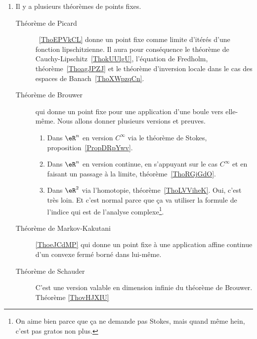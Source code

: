         \label{THEMEooWAYJooUSnmMh}
\begin{enumerate}
	\item
	      Il y a plusieurs théorèmes de points fixes.
	      \begin{description}
		      \item[Théorème de Picard]~\ref{ThoEPVkCL} donne un point fixe comme limite d'itérés d'une fonction lipschitzienne. Il aura pour conséquence le théorème de Cauchy-Lipschitz~\ref{ThokUUlgU}, l'équation de Fredholm, théorème~\ref{ThoagJPZJ} et le théorème d'inversion locale dans le cas des espaces de Banach~\ref{ThoXWpzqCn}.
		      \item[Théorème de Brouwer] qui donne un point fixe pour une application d'une boule vers elle-même. Nous allons donner plusieurs versions et preuves.
			      \begin{enumerate}
				      \item
				            Dans \( \eR^n\) en version \( C^{\infty}\) via le théorème de Stokes, proposition~\ref{PropDRpYwv}.
				      \item
				            Dans \( \eR^n\) en version continue, en s'appuyant sur le cas \( C^{\infty}\) et en faisant un passage à la limite, théorème~\ref{ThoRGjGdO}.
				      \item
				            Dans \( \eR^2\) via l'homotopie, théorème~\ref{ThoLVViheK}. Oui, c'est très loin. Et c'est normal parce que ça va utiliser la formule de l'indice qui est de l'analyse complexe\footnote{On aime bien parce que ça ne demande pas Stokes, mais quand même hein, c'est pas gratos non plus.}.
			      \end{enumerate}
			      \item[Théorème de Markov-Kakutani]\ref{ThoeJCdMP} qui donne un point fixe à une application affine continue d'un convexe fermé borné dans lui-même.
		      \item[Théorème de Schauder] C'est une version valable en dimension infinie du théorème de Brouwer. Théorème \ref{ThovHJXIU}
	      \end{description}


\end{enumerate}
